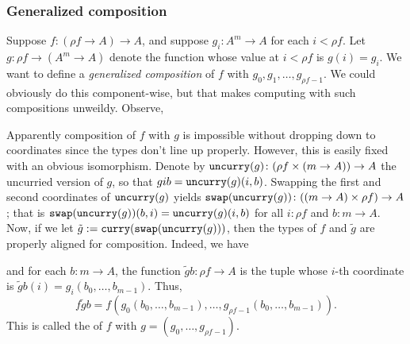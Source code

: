 \subsubsection{Generalized composition}

Suppose $f \colon (\rho f \to A) \to A$, and suppose 
$g_i \colon A^m \to A$ for each $i <\rho f$.
Let $g \colon \rho f \to (A^m \to A)$ denote
the function whose value at $i < \rho f$ is 
$g(i) = g_i$. We want to define a \emph{generalized composition} of $f$ 
with $g_0, g_1, \dots, g_{\rho f -1}$.  We could obviously do this component-wise,
but that makes computing with such compositions unweildy.
Observe,
\begin{prooftree}
\end{prooftree}
\begin{prooftree}
\end{prooftree}
Apparently composition of $f$ with $g$ is impossible without dropping down to coordinates
since the types don't line up properly. 
However, this is easily fixed with an obvious isomorphism. 
Denote by $\uncurry{g} \colon (\rho f \times (m \to A)) \to A$
the uncurried version of $g$, so that $gib = \uncurry{g}(i,b)$.
Swapping the first and second coordinates of $\uncurry{g}$ yields
$\swap{\uncurry{g}} \colon ((m\to A) \times \rho f) \to A$; that is  
$\swap{\uncurry{g}}(b,i) = \uncurry{g} (i,b)$ for all $i \colon \rho f$ and $b \colon m \to A$.  
Now, if we let $\tilde{g} := \curry{\swap{\uncurry{g}}}$, then the types of $f$ and $\tilde{g}$ 
are properly aligned for composition.
Indeed, we have
\begin{prooftree}
\end{prooftree}
and for each $b \colon m \to A$, the function $\tilde{g}b \colon \rho f \to A$ is the tuple 
whose $i$-th coordinate is $\tilde{g}b(i) = g_i(b_0, \dots, b_{m-1})$. Thus,
\[
  f\tilde{g} b = f(g_0 (b_0, \dots, b_{m-1}), \dots, g_{\rho f -1}(b_0, \dots, b_{m-1})).
  \]
This is called the  of $f$ with $g = (g_0, \dots, g_{\rho f -1})$.
    


